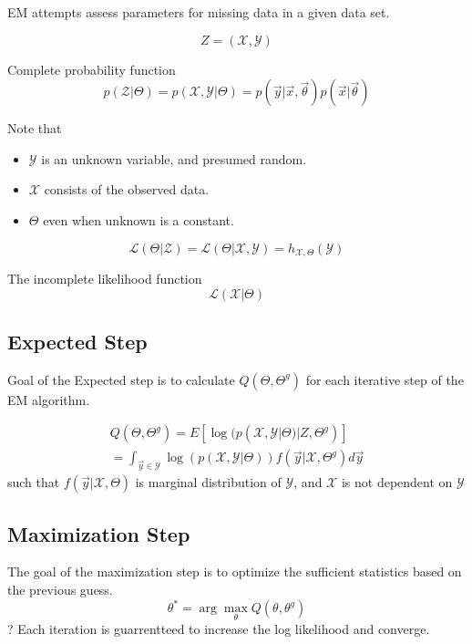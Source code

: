 EM attempts assess parameters for missing data in a given data set.  

\begin{equation}
Z = ( \mathcal{X}, \mathcal{Y}) 
\end{equation}


Complete probability function
\begin{equation}
p(\mathcal{Z} | \Theta)  = p(\mathcal{X},\mathcal{Y} | \Theta) = p(\vec{y}| \vec{x}, \vec{\theta}) p( \vec{x}| \vec{\theta})
\end{equation}

Note that 
\begin{itemize}
	\item $\mathcal{Y}$ is an unknown variable, and presumed random.  
	\item $\mathcal{X}$ consists of the observed data. 
	\item $\Theta$ even when unknown is a constant.
\end{itemize}



\begin{equation}
\mathcal{L} ( \Theta | \mathcal{Z}) = \mathcal{L} ( \Theta | \mathcal{X}, \mathcal{Y}) = h_{\mathcal{X}, \Theta} ( \mathcal{Y})
\end{equation}

The incomplete likelihood function 
\begin{equation}
\mathcal{L}(\mathcal{X}| \Theta)
\end{equation}

\subsection{Expected Step}
Goal of the Expected step is to calculate $Q( \Theta , \Theta ^g)$ for each iterative step of the EM algorithm.  

\begin{eqnarray}
Q ( \Theta , \Theta^g) = E [ \log (p (\mathcal{X}, \mathcal{Y} | \Theta) | Z, \Theta ^g)] \\
= \int _{\vec{y} \in \mathcal{Y}}\log (p(\mathcal{X}, \mathcal{Y} | \Theta))  f ( \vec{y}| \mathcal{X} , \Theta ^g) d \vec{y}
\end{eqnarray}
such that $f(\vec{y}| \mathcal{X}, \Theta)$  is marginal distribution of $\mathcal{Y}$, and $\mathcal{X}$ is not dependent on $\mathcal{Y}$


\subsection{Maximization Step}
The goal of the maximization step is to optimize the sufficient statistics based on the previous guess. 
\begin{equation}
\theta^* = \arg \max _{\theta} Q ( \theta , \theta^g)
\end{equation}
? Each iteration is guarrentteed to increase the log likelihood and converge.


